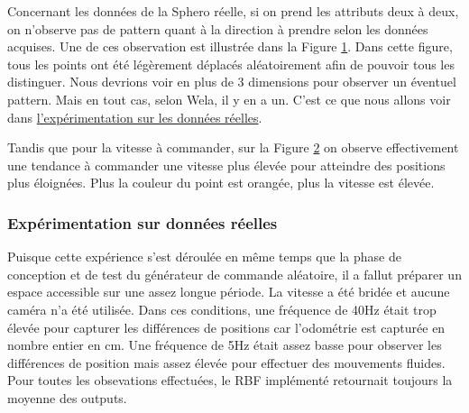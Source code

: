 \begin{figure}
 \centering
 \label{we:targetxy}
\end{figure}
Concernant les données de la Sphero réelle, si on prend les attributs deux à deux, on n'observe pas de pattern quant à la direction à prendre selon les données acquises.
Une de ces observation est illustrée dans la Figure \ref{we:targetxy}.
Dans cette figure, tous les points ont été légèrement déplacés aléatoirement afin de pouvoir tous les distinguer.
Nous devrions voir en plus de 3 dimensions pour observer un éventuel pattern.
Mais en tout cas, selon Wela, il y en a un.
C'est ce que nous allons voir dans \hyperref[sec:realdataex]{l'expérimentation sur les données réelles}.

\begin{figure}
 \centering
 \label{we:targetxySpeed}
\end{figure}
Tandis que pour la vitesse à commander, sur la Figure \ref{we:targetxySpeed} on observe effectivement une tendance à commander une vitesse plus élevée pour atteindre des positions plus éloignées.
Plus la couleur du point est orangée, plus la vitesse est élevée.

\subsubsection{Expérimentation sur données réelles}\label{sec:realdataex}
Puisque cette expérience s'est déroulée en même temps que la phase de conception et de test du générateur de commande aléatoire,
il a fallut préparer un espace accessible sur une assez longue période.
La vitesse a été bridée et aucune caméra n'a été utilisée.
Dans ces conditions, une fréquence de 40Hz était trop élevée pour capturer les différences de positions car l'odométrie est capturée en nombre entier en cm.
Une fréquence de 5Hz était assez basse pour observer les différences de position mais assez élevée pour effectuer des mouvements fluides.
Pour toutes les obsevations effectuées, le RBF implémenté retournait toujours la moyenne des outputs.

